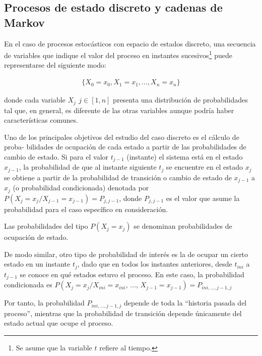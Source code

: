 \subsection{Procesos de estado discreto y cadenas de Markov}
\label{CapVI_2}

En el caso de procesos estoc\'asticos con espacio de estados discreto, una secuencia de variables que indique el valor del proceso en 
instantes sucesivos\footnote{Se asume que la variable $t$ refiere al tiempo.} puede representarse del siguiente modo:


\begin{eqnarray}
	\{ X_{0} = x_{0}, X_{1} = x_{1}, ... , X_{n} = x_{n} \}
\label{EqLXXXIV}
\end{eqnarray}

donde cada variable $X_{j} \, \: j \in [1, n]$ presenta una distribuci\'on de probabilidades tal que, en general, es diferente de las otras 
variables aunque podr\'ia haber caracter\'isticas comunes.

Uno de los principales objetivos del estudio del caso discreto es el c\'alculo de proba-\-
bilidades 
de ocupaci\'on de cada estado a partir de las probabilidades de cambio de estado. 
%
Si para el valor $t_{j-1}$ (instante) el sistema est\'a en el estado $x_{j-1}$, la probabilidad 
de que al 
instante siguiente $t_{j}$ se encuentre en el estado $x_{j}$ se obtiene a partir de la 
probabilidad de transici\'on o cambio de estado de $x_{j-1}$ a $x_{j}$ (o probabilidad 
condicionada) denotada por $P\left( X_{j} = x_{j} / X_{j-1} = x_{j-1} \right) = P_{j, j-1}$, donde 
$P_{j, j-1}$ es el valor que asume la probabilidad para el caso espec\'ifico en consideraci\'on.
%

Las probabilidades del tipo $P \left( X_{j} = x_{j} \right)$ se denominan probabilidades de 
ocupaci\'on de estado.
%

De modo similar, otro tipo de probabilidad de inter\'es es la de ocupar un cierto estado en un 
instante $t_{j}$, dado que en todos los 
instantes anteriores, desde $t_{ini}$ a $t_{j-1}$ se conoce en qu\'e estados estuvo el proceso. 
%
En este caso, la probabilidad condicionada es 
$P \left( X_{j} = x_{j} / X_{ini} = x_{ini}, \, ... , \, X_{j-1} = x_{j-1} \right) = 
P_{ini, ..., j-1, j}$

Por tanto, la probabilidad $P_{ini, ..., j-1, j}$ depende de toda la ``historia pasada del 
proceso'', mientras que la probabilidad de transici\'on depende \'unicamente del estado actual que 
ocupe el proceso.
\newpage

